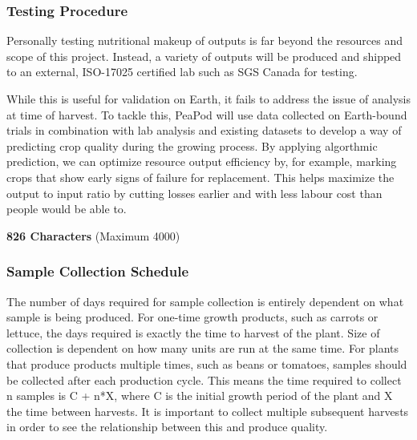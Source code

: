 \subsubsection{Testing Procedure}

Personally testing nutritional makeup of outputs is far beyond the resources and scope of this project. Instead, a variety of outputs will be produced and shipped to an external, ISO-17025 certified lab such as SGS Canada for testing.

While this is useful for validation on Earth, it fails to address the issue of analysis at time of harvest. To tackle this, PeaPod will use data collected on Earth-bound trials in combination with lab analysis and existing datasets to develop a way of predicting crop quality during the growing process. By applying algorthmic prediction, we can optimize resource output efficiency by, for example, marking crops that show early signs of failure for replacement. This helps maximize the output to input ratio by cutting losses earlier and with less labour cost than people would be able to.


\textbf{826 Characters} (Maximum 4000)

\subsubsection{Sample Collection Schedule}

The number of days required for sample collection is entirely dependent on what sample is being produced. For one-time growth products, such as carrots or lettuce, the days required is exactly the time to harvest of the plant. Size of collection is dependent on how many units are run at the same time. For plants that produce products multiple times, such as beans or tomatoes, samples should be collected after each production cycle. This means the time required to collect n samples is C + n*X, where C is the initial growth period of the plant and X the time between harvests. It is important to collect multiple subsequent harvests in order to see the relationship between this and produce quality.

